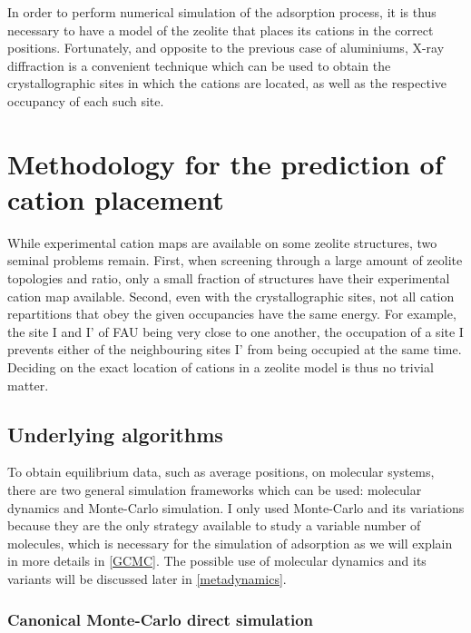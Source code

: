 \documentclass[main.tex]{subfiles}
\begin{document}
In order to perform numerical simulation of the adsorption process, it is thus necessary to have a model of the zeolite that places its cations in the correct positions. Fortunately, and opposite to the previous case of aluminiums, X-ray diffraction is a convenient technique which can be used to obtain the crystallographic sites in which the cations are located, as well as the respective occupancy of each such site.


\section{Methodology for the prediction of cation placement}

While experimental cation maps are available on some zeolite structures, two seminal problems remain. First, when screening through a large amount of zeolite topologies and \SiAl ratio, only a small fraction of structures have their experimental cation map available. Second, even with the crystallographic sites, not all cation repartitions that obey the given occupancies have the same energy. For example, the site I and I' of FAU being very close to one another, the occupation of a site I prevents either of the neighbouring sites I' from being occupied at the same time. Deciding on the exact location of cations in a zeolite model is thus no trivial matter.

\subsection{Underlying algorithms}

To obtain equilibrium data, such as average positions, on molecular systems, there are two general simulation frameworks which can be used: molecular dynamics and Monte-Carlo simulation. I only used Monte-Carlo and its variations because they are the only strategy available to study a variable number of molecules, which is necessary for the simulation of adsorption as we will explain in more details in \cref{GCMC}. The possible use of molecular dynamics and its variants will be discussed later in \cref{metadynamics}.

\subsubsection{Canonical Monte-Carlo direct simulation}
\end{document}

